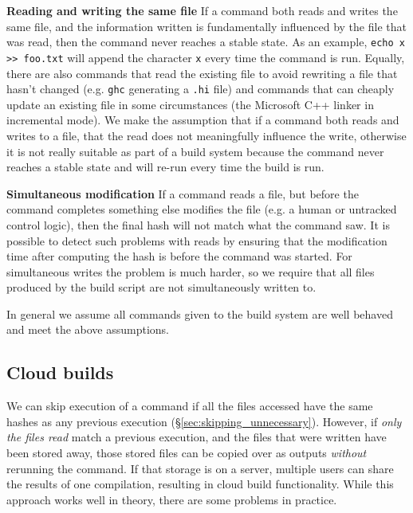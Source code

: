 \textbf{Reading and writing the same file} If a command both reads and writes the same file, and the information written is fundamentally influenced by the file that was read, then the command never reaches a stable state. As an example, \verb"echo x >> foo.txt" will append the character \texttt{x} every time the command is run. Equally, there are also commands that read the existing file to avoid rewriting a file that hasn't changed (e.g. \texttt{ghc} generating a \texttt{.hi} file) and commands that can cheaply update an existing file in some circumstances (the Microsoft C++ linker in incremental mode). We make the assumption that if a command both reads and writes to a file, that the read does not meaningfully influence the write, otherwise it is not really suitable as part of a build system because the command never reaches a stable state and will re-run every time the build is run.


\textbf{Simultaneous modification} If a command reads a file, but before the command completes something else modifies the file (e.g. a human or untracked control logic), then the final hash will not match what the command saw. It is possible to detect such problems with reads by ensuring that the modification time after computing the hash is before the command was started. For simultaneous writes the problem is much harder, so we require that all files produced by the build script are not simultaneously written to.

\postparagraphs In general we assume all commands given to the build system are well behaved and meet the above assumptions.

\subsection{Cloud builds}
\label{sec:cloud_builds}

We can skip execution of a command if all the files accessed have the same hashes as any previous execution (\S\ref{sec:skipping_unnecessary}). However, if \emph{only the files read} match a previous execution, and the files that were written have been stored away, those stored files can be copied over as outputs \emph{without} rerunning the command. If that storage is on a server, multiple users can share the results of one compilation, resulting in cloud build functionality. While this approach works well in theory, there are some problems in practice.

